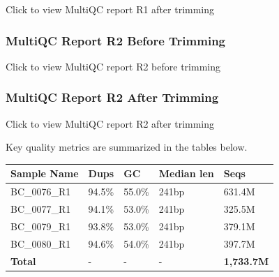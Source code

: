 \documentclass[
  11pt,
  a4paper,
]{report}
\begin{document}
Click to view MultiQC report R1 after trimming

\subsubsection{MultiQC Report R2 Before Trimming}

Click to view MultiQC report R2 before trimming

\subsubsection{MultiQC Report R2 After Trimming}

Click to view MultiQC report R2 after trimming

Key quality metrics are summarized in the tables below.

\begin{table}

\caption{\label{tbl-example}Before trimming}

\begin{minipage}{\linewidth}

\begin{longtable}[]{@{}lllll@{}}
\toprule\noalign{}
Sample Name & Dups & GC & Median len & Seqs \\
\midrule\noalign{}
\endhead
\bottomrule\noalign{}
\endlastfoot
BC\_0076\_R1 & 94.5\% & 55.0\% & 241bp & 631.4M \\
BC\_0077\_R1 & 94.1\% & 53.0\% & 241bp & 325.5M \\
BC\_0079\_R1 & 93.8\% & 53.0\% & 241bp & 379.1M \\
BC\_0080\_R1 & 94.6\% & 54.0\% & 241bp & 397.7M \\
\textbf{Total} & - & - & - & \textbf{1,733.7M} \\
\end{longtable}

\end{minipage}%

\end{table}%
\end{document}
